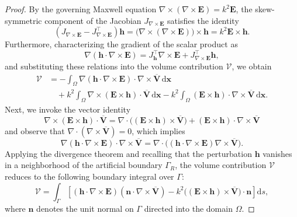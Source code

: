 \documentclass[12pt,reqno]{amsart}
\theoremstyle{definition}
\numberwithin{equation}{section}
\begin{document}
\begin{proof}
By the governing Maxwell equation $\nabla \times (\nabla \times \mathbf{E}) = k^2 \mathbf{E}$, the skew-symmetric component of the Jacobian $J_{\nabla \times \mathbf{E}}$ satisfies the identity
\[
(J_{\nabla \times \mathbf{E}} - J_{\nabla \times \mathbf{E}}^{\top}) \mathbf{h} = \bigl( \nabla \times (\nabla \times \mathbf{E}) \bigr) \times \mathbf{h} = k^2 \mathbf{E} \times \mathbf{h}.
\]
Furthermore, characterizing the gradient of the scalar product as 
\[
\nabla (\mathbf{h} \cdot \nabla \times \mathbf{E}) = J_{\mathbf{h}}^{\top} \nabla \times \mathbf{E} + J_{\nabla \times \mathbf{E}}^{\top} \mathbf{h},
\]
and substituting these relations into the volume contribution $\mathscr V$, we obtain
\begin{equation*}
\begin{aligned}
\mathscr V &= -\int_\Omega \nabla (\mathbf{h} \cdot \nabla \times \mathbf{E}) \cdot \nabla \times \overline{\mathbf{V}} \,\mathrm{d}\boldsymbol{x} \\
&\quad + k^2 \int_\Omega \nabla \times (\mathbf{E} \times \mathbf{h}) \cdot \overline{\mathbf{V}} \,\mathrm{d}\boldsymbol{x} - k^2 \int_\Omega (\mathbf{E} \times \mathbf{h}) \cdot \nabla \times \overline{\mathbf{V}} \,\mathrm{d}\boldsymbol{x}.
\end{aligned}
\end{equation*}
Next, we invoke the vector identity
\[
\nabla \times (\mathbf{E} \times \mathbf{h}) \cdot \overline{\mathbf{V}} = \nabla \cdot \bigl( (\mathbf{E} \times \mathbf{h}) \times \overline{\mathbf{V}} \bigr) + (\mathbf{E} \times \mathbf{h}) \cdot \nabla \times \overline{\mathbf{V}}
\]
and observe that $\nabla \cdot (\nabla \times \overline{\mathbf{V}}) = 0$, which implies
\[
\nabla (\mathbf{h} \cdot \nabla \times \mathbf{E}) \cdot \nabla \times \overline{\mathbf{V}} = \nabla \cdot \bigl( (\mathbf{h} \cdot \nabla \times \mathbf{E}) \nabla \times \overline{\mathbf{V}} \bigr).
\]
Applying the divergence theorem and recalling that the perturbation $\mathbf{h}$ vanishes in a neighborhood of the artificial boundary $\Gamma_R$, the volume contribution $\mathscr V$ reduces to the following boundary integral over $\Gamma$:
\begin{equation}
\label{eq:A_boundary_initial}
\mathscr V = \int_\Gamma \left[ (\mathbf{h} \cdot \nabla \times \mathbf{E}) (\mathbf{n} \cdot \nabla \times \overline{\mathbf{V}}) - k^2 \bigl( (\mathbf{E} \times \mathbf{h}) \times \overline{\mathbf{V}} \bigr) \cdot \mathbf{n} \right] \mathrm{d}s,
\end{equation}
where $\mathbf{n}$ denotes the unit normal on $\Gamma$ directed into the domain $\Omega$.


\end{proof}
\end{document}
